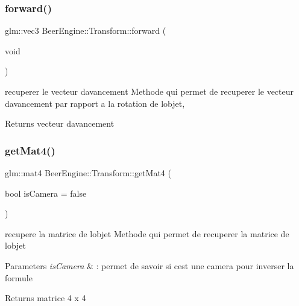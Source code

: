 \mbox{\label{class_beer_engine_1_1_transform_a82f0d0d75290c73e5ae8267e2d76f83b}} 
\subsubsection{\texorpdfstring{forward()}{forward()}}
{\footnotesize\ttfamily glm\+::vec3 Beer\+Engine\+::\+Transform\+::forward (\begin{DoxyParamCaption}\item[{void}]{ }\end{DoxyParamCaption})}



recuperer le vecteur d\textquotesingle{}avancement Methode qui permet de recuperer le vecteur d\textquotesingle{}avancement par rapport a la rotation de l\textquotesingle{}objet, 

\begin{DoxyReturn}{Returns}
vecteur d\textquotesingle{}avancement 
\end{DoxyReturn}
\mbox{\label{class_beer_engine_1_1_transform_a9b7d3168270eb800c3e40af55c55fdc5}} 
\subsubsection{\texorpdfstring{get\+Mat4()}{getMat4()}}
{\footnotesize\ttfamily glm\+::mat4 Beer\+Engine\+::\+Transform\+::get\+Mat4 (\begin{DoxyParamCaption}\item[{bool}]{is\+Camera = {\ttfamily false} }\end{DoxyParamCaption})}



recupere la matrice de l\textquotesingle{}objet Methode qui permet de recuperer la matrice de l\textquotesingle{}objet 


\begin{DoxyParams}{Parameters}
{\em is\+Camera} & \+: permet de savoir si c\textquotesingle{}est une camera pour inverser la formule \\
\hline
\end{DoxyParams}
\begin{DoxyReturn}{Returns}
matrice 4 x 4 
\end{DoxyReturn}
\mbox{\label{class_beer_engine_1_1_transform_a2699038279b5b41831ff706c5ccc9348}} 
